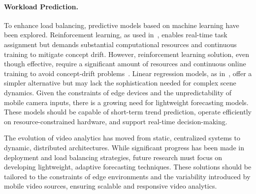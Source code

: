 \paragraph{Workload Prediction.}

To enhance load balancing, predictive models based on machine learning have been explored. Reinforcement learning, as used in~\cite{yuan2021online}, enables real-time task assignment but demands substantial computational resources and continuous training to mitigate concept drift. However, reinforcement learning solution, even though effective, require a significant amount of resources and continuous online training to avoid concept-drift problems~\cite{zhang2020reinforcement}. Linear regression models, as in~\cite{kombi2017preventive}, offer a simpler alternative but may lack the sophistication needed for complex scene dynamics.
Given the constraints of edge devices and the unpredictability of mobile camera inputs, there is a growing need for lightweight forecasting models. These models should be capable of short-term trend prediction, operate efficiently on resource-constrained hardware, and support real-time decision-making.

The evolution of video analytics has moved from static, centralized systems to dynamic, distributed architectures. While significant progress has been made in deployment and load balancing strategies, future research must focus on developing lightweight, adaptive forecasting techniques. These solutions should be tailored to the constraints of edge environments and the variability introduced by mobile video sources, ensuring scalable and responsive video analytics.




